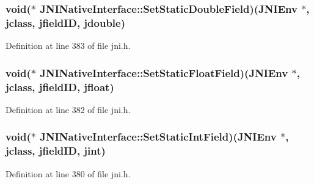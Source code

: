 \hypertarget{struct_j_n_i_native_interface_ad2ff941261ce8206491ccd7acd97c0c1}{
\subsubsection[{Set\-Static\-Double\-Field}]{\setlength{\rightskip}{0pt plus 5cm}void($\ast$ J\-N\-I\-Native\-Interface\-::\-Set\-Static\-Double\-Field)({\bf J\-N\-I\-Env} $\ast$, {\bf jclass}, {\bf jfield\-I\-D}, {\bf jdouble})}}\label{struct_j_n_i_native_interface_ad2ff941261ce8206491ccd7acd97c0c1}


Definition at line 383 of file jni.\-h.

\hypertarget{struct_j_n_i_native_interface_a68b9b274d1a9584a9ba724f6a01045cc}{
\subsubsection[{Set\-Static\-Float\-Field}]{\setlength{\rightskip}{0pt plus 5cm}void($\ast$ J\-N\-I\-Native\-Interface\-::\-Set\-Static\-Float\-Field)({\bf J\-N\-I\-Env} $\ast$, {\bf jclass}, {\bf jfield\-I\-D}, {\bf jfloat})}}\label{struct_j_n_i_native_interface_a68b9b274d1a9584a9ba724f6a01045cc}


Definition at line 382 of file jni.\-h.

\hypertarget{struct_j_n_i_native_interface_ae71a2d8a360ad10c30aadc48032b6d2f}{
\subsubsection[{Set\-Static\-Int\-Field}]{\setlength{\rightskip}{0pt plus 5cm}void($\ast$ J\-N\-I\-Native\-Interface\-::\-Set\-Static\-Int\-Field)({\bf J\-N\-I\-Env} $\ast$, {\bf jclass}, {\bf jfield\-I\-D}, {\bf jint})}}\label{struct_j_n_i_native_interface_ae71a2d8a360ad10c30aadc48032b6d2f}


Definition at line 380 of file jni.\-h.

